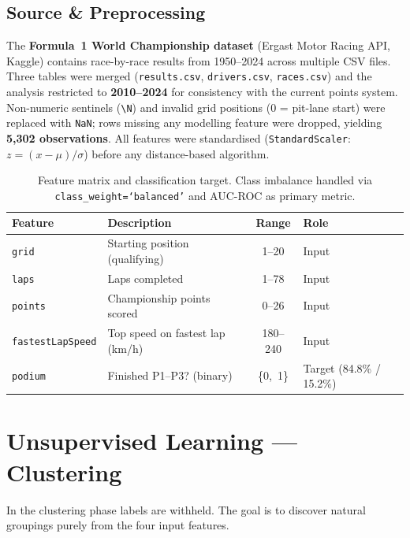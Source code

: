 \documentclass[11pt,a4paper]{article}
\begin{document}
\subsection{Source \& Preprocessing}

The \textbf{Formula~1 World Championship dataset} (Ergast Motor Racing API,
Kaggle) contains race-by-race results from 1950--2024 across multiple CSV files.
Three tables were merged (\texttt{results.csv}, \texttt{drivers.csv},
\texttt{races.csv}) and the analysis restricted to \textbf{2010--2024} for
consistency with the current points system. Non-numeric sentinels (\texttt{\textbackslash N})
and invalid grid positions (0 = pit-lane start) were replaced with \texttt{NaN};
rows missing any modelling feature were dropped, yielding \textbf{5,302 observations}.
All features were standardised (\texttt{StandardScaler}: $z = (x-\mu)/\sigma$)
before any distance-based algorithm.

\begin{table}[H]
\centering\small\renewcommand{\arraystretch}{1.25}
\begin{tabular}{llcl}
\toprule
\textbf{Feature} & \textbf{Description} & \textbf{Range} & \textbf{Role} \\
\midrule
\texttt{grid}            & Starting position (qualifying) & 1--20    & Input \\
\texttt{laps}            & Laps completed                 & 1--78    & Input \\
\texttt{points}          & Championship points scored     & 0--26    & Input \\
\texttt{fastestLapSpeed} & Top speed on fastest lap (km/h)& 180--240 & Input \\
\midrule
\texttt{podium}          & Finished P1--P3? (binary)      & \{0,~1\} & Target (84.8\% / 15.2\%) \\
\bottomrule
\end{tabular}
\caption{Feature matrix and classification target. Class imbalance handled via
\texttt{class\_weight=`balanced'} and AUC-ROC as primary metric.}
\end{table}

\section{Unsupervised Learning --- Clustering}

In the clustering phase labels are withheld. The goal is to discover natural
groupings purely from the four input features.
\end{document}

